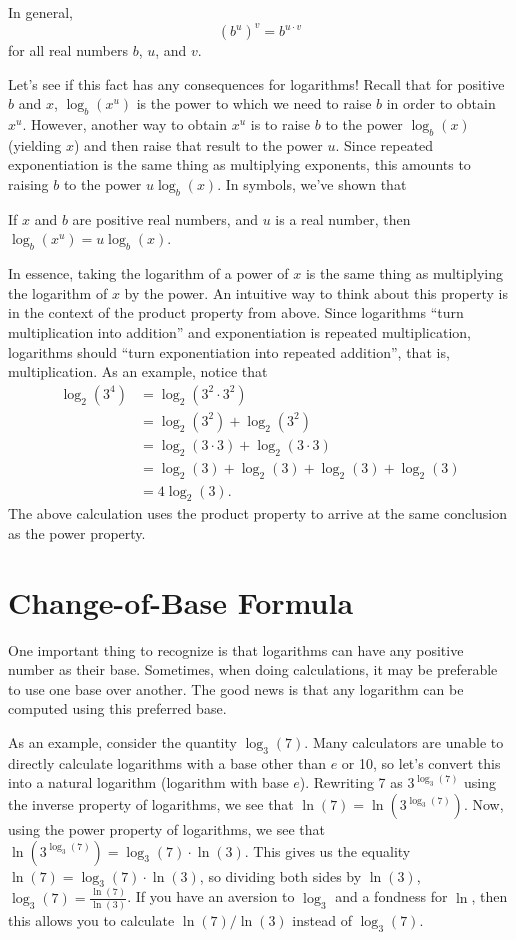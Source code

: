\documentclass[nooutcomes]{ximera}
\begin{document}
In general, $$(b^u)^v = b^{u \cdot v}$$ for all real numbers $b$, $u$, and $v$. 

Let's see if this fact has any consequences for logarithms! Recall that for positive $b$ and $x$, $\log_b(x^u)$ is the power to which we need to raise $b$ in order to obtain $x^u$. However, another way to obtain $x^u$ is to raise $b$ to the power $\log_b(x)$ (yielding $x$) and then raise that result to the power $u$. Since repeated exponentiation is the same thing as multiplying exponents, this amounts to raising $b$ to the power $u\log_b(x)$. In symbols, we've shown that
\begin{callout}
If $x$ and $b$ are positive real numbers, and $u$ is a real number, then $\log_b(x^u) = u \log_b(x)$.
\end{callout}

In essence, taking the logarithm of a power of $x$ is the same thing as multiplying the logarithm of $x$ by the power. An intuitive way to think about this property is in the context of the product property from above. Since logarithms ``turn multiplication into addition'' and exponentiation is repeated multiplication, logarithms should ``turn exponentiation into repeated addition'', that is, multiplication. As an example, notice that 
\begin{align*}
\log_2(3^4) & = \log_2(3^2 \cdot 3^2) \\
& = \log_2(3^2) + \log_2(3^2) \\
& = \log_2(3\cdot 3) + \log_2(3\cdot 3) \\
& = \log_2(3) + \log_2(3) + \log_2(3) + \log_2(3) \\
& = 4\log_2(3).
\end{align*}
The above calculation uses the product property to arrive at the same conclusion as the power property. 

\section{Change-of-Base Formula}
One important thing to recognize is that logarithms can have any positive number as their base. Sometimes, when doing calculations, it may be preferable to use one base over another. The good news is that any logarithm can be computed using this preferred base. 

As an example, consider the quantity $\log_3(7)$. Many calculators are unable to directly calculate logarithms with a base other than $e$ or 10, so let's convert this into a natural logarithm (logarithm with base $e$). Rewriting 7 as $3^{\log_3(7)}$ using the inverse property of logarithms, we see that $\ln(7) = \ln(3^{\log_3(7)})$. Now, using the power property of logarithms, we see that $\ln(3^{\log_3(7)}) = \log_3(7)\cdot \ln(3)$. This gives us the equality $\ln(7) = \log_3(7)\cdot \ln(3)$, so dividing both sides by $\ln(3)$, $\log_3(7) = \frac{\ln(7)}{\ln(3)}$. If you have an aversion to $\log_3$ and a fondness for $\ln$, then this allows you to calculate $\ln(7)/\ln(3)$ instead of $\log_3(7)$. 
\end{document}
